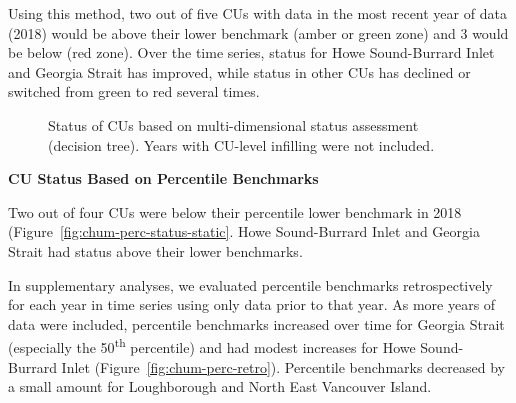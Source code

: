 \documentclass[11pt]{book}
\begin{document}
Using this method, two out of five CUs with data in the most recent year of data (2018) would be above their lower benchmark (amber or green zone) and 3 would be below (red zone). Over the time series, status for Howe Sound-Burrard Inlet and Georgia Strait has improved, while status in other CUs has declined or switched from green to red several times.
\begin{figure}[htb]

{\centering {} 

}

\caption{Status of CUs based on multi-dimensional status assessment (decision tree). Years with CU-level infilling were not included.}\label{fig:chum-CU-status-tree}
\end{figure}
\textbf{CU Status Based on Percentile Benchmarks}

Two out of four CUs were below their percentile lower benchmark in 2018 (Figure~\ref{fig:chum-perc-status-static}. Howe Sound-Burrard Inlet and Georgia Strait had status above their lower benchmarks.

In supplementary analyses, we evaluated percentile benchmarks retrospectively for each year in time series using only data prior to that year. As more years of data were included, percentile benchmarks increased over time for Georgia Strait (especially the 50\textsuperscript{th} percentile) and had modest increases for Howe Sound-Burrard Inlet (Figure~\ref{fig:chum-perc-retro}). Percentile benchmarks decreased by a small amount for Loughborough and North East Vancouver Island.
\end{document}
